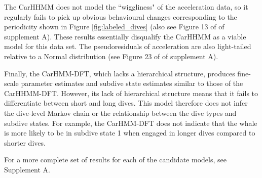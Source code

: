 The CarHHMM does not model the ``wiggliness" of the acceleration data, so it regularly fails to pick up obvious behavioural changes corresponding to the periodicity shown in Figure \ref{fig:labeled_dives} (also see Figure 13 of of supplement A). These results essentially disqualify the CarHHMM as a viable model for this data set. The pseudoresiduals of acceleration are also light-tailed relative to a Normal distribution (see Figure 23 of of supplement A).

Finally, the CarHMM-DFT, which lacks a hierarchical structure, produces fine-scale parameter estimates and subdive state estimates similar to those of the CarHHMM-DFT. However, its lack of hierarchical structure means that it fails to differentiate between short and long dives. This model therefore does not infer the dive-level Markov chain or the relationship between the dive types and subdive states. For example, the CarHMM-DFT does not indicate that the whale is more likely to be in subdive state 1 when engaged in longer dives compared to shorter dives. 

For a more complete set of results for each of the candidate models, see Supplement A.